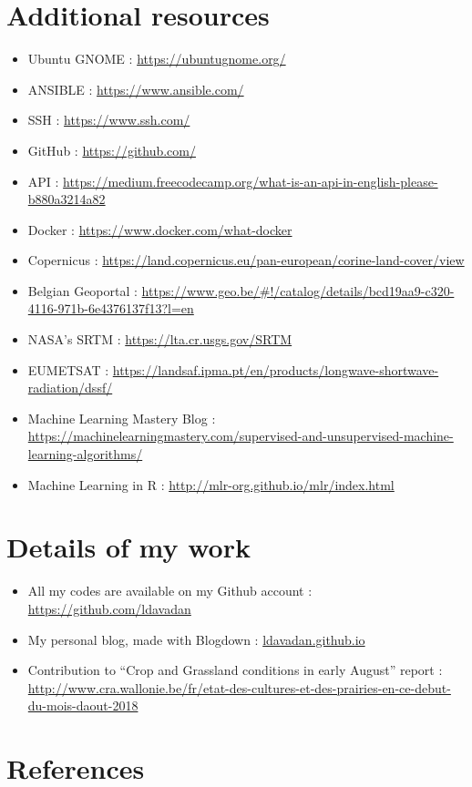 \documentclass[12pt,twoside]{reedthesis}
\theoremstyle{definition}
\theoremstyle{definition}
\theoremstyle{definition}
\theoremstyle{remark}
\begin{document}
\chapter{Additional resources}\label{additional-resources}
\begin{itemize}
\item
  Ubuntu GNOME : \url{https://ubuntugnome.org/}
\item
  ANSIBLE : \url{https://www.ansible.com/}
\item
  SSH : \url{https://www.ssh.com/}
\item
  GitHub : \url{https://github.com/}
\item
  API :
  \url{https://medium.freecodecamp.org/what-is-an-api-in-english-please-b880a3214a82}
\item
  Docker : \url{https://www.docker.com/what-docker}
\item
  Copernicus :
  \url{https://land.copernicus.eu/pan-european/corine-land-cover/view}
\item
  Belgian Geoportal :
  \url{https://www.geo.be/\#!/catalog/details/bcd19aa9-c320-4116-971b-6e4376137f13?l=en}
\item
  NASA's SRTM : \url{https://lta.cr.usgs.gov/SRTM}
\item
  EUMETSAT :
  \url{https://landsaf.ipma.pt/en/products/longwave-shortwave-radiation/dssf/}
\item
  Machine Learning Mastery Blog :
  \url{https://machinelearningmastery.com/supervised-and-unsupervised-machine-learning-algorithms/}
\item
  Machine Learning in R : \url{http://mlr-org.github.io/mlr/index.html}
\end{itemize}
\chapter{Details of my work}\label{details-of-my-work}
\begin{itemize}
\item
  All my codes are available on my Github account :
  \url{https://github.com/ldavadan}
\item
  My personal blog, made with Blogdown : \url{ldavadan.github.io}
\item
  Contribution to ``Crop and Grassland conditions in early August''
  report :
  \url{http://www.cra.wallonie.be/fr/etat-des-cultures-et-des-prairies-en-ce-debut-du-mois-daout-2018}
\end{itemize}
\backmatter

\chapter*{References}\label{references}
\end{document}
